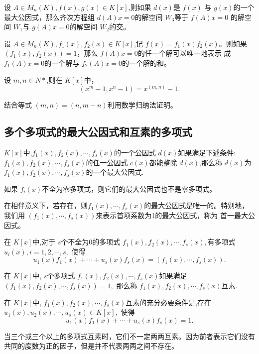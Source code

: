 \begin{myprop}
    设 $A\in M_n(K),f(x),g(x)\in K[x]$,则如果 $d(x)$是 $f(x)$ 与 $g(x)$的一个最大公因式，那么齐次方程组 $d(A)x=0$的解空间 $W_3$等于 $f(A)x=0$
    的解空间 $W_1$与 $g(A)x=0$的解空间 $W_2$的交。
\end{myprop}
\begin{myprop}
    设 $A\in M_n(K),f_1(x),f_2(x)\in K[x]$,记 $f(x)=f_1(x)f_2(x)$。则如果 $(f_1(x),f_2(x))=1$，那么 $f(A)x=0$的任一个解可以唯一地表示
    成 $f_1(A)x=0$的一个解与 $f_2(A)x=0$的一个解的和。
\end{myprop}
\begin{myprop}
    设 $m,n\in N*$,则在 $K[x]$中，
    \[(x^m-1,x^n-1)=x^{(m,n)}-1.\]
\end{myprop}
\begin{myrmk}
    结合等式 $(m,n)=(n,m-n)$利用数学归纳法证明。
\end{myrmk}
\subsection{多个多项式的最大公因式和互素的多项式}
\begin{mydef}
    $K[x]$中,$f_1(x),f_2(x),\cdots,f_s(x)$的一个公因式 $d(x)$如果满足下述条件:
    $f_1(x),f_2(x),\cdots,f_s(x)$的任一公因式 $c(x)$都能整除 $d(x)$,那么称 $d(x)$为 
    $f_1(x),f_2(x),\cdots,f_s(x)$的一个最大公因式.
\end{mydef}
如果 $f_i(x)$不全为零多项式，则它们的最大公因式也不是零多项式。

在相伴意义下，若存在，则$f_1(x),\cdots,f_s(x)$的最大公因式是唯一的。特别地，我们用 $(f_1(x),\cdots,f_s(x))$来表示首项系数为1的最大公因式，称为
首一最大公因式。
\begin{mythm}
    在 $K[x]$中,对于 $s$个不全为0的多项式 $f_1(x),f_2(x),\cdots,f_s(x),$有多项式 $u_i(x),i=1,2,\cdots,s,$
    使得
    \[u_1(x)f_1(x)+\cdots + u_s(x)f_s(x)=(f_1(x),\cdots,f_s(x)).\]
\end{mythm}
\begin{mydef}
    在 $K[x]$中, $s$个多项式 $f_1(x),f_2(x),\cdots,f_s(x)$如果满足 $(f_1(x),f_2(x),\cdots,f_s(x))=1,$
    那么称 $f_1(x),f_2(x),\cdots,f_s(x)$互素.
\end{mydef}
\begin{mythm}
    在 $K[x]$中, $f_1(x),f_2(x),\cdots,f_s(x)$互素的充分必要条件是,存在 $u_1(x),u_2(x),\cdots,u_s(x)\in K[x],$
    使得 
    \[u_1(x)f_1(x)+\cdots+u_s(x)f_s(x)=1.\]
\end{mythm}
\begin{myrmk}
    当三个或三个以上的多项式互素时，它们不一定两两互素。因为前者表示它们没有共同的度数为正的因子，但是并不代表两两之间不存在。
\end{myrmk}
